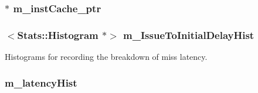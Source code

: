 \label{classSequencer_a0dbfb83f6edf61cad3d0aebdc89ed370}
\hypertarget{classSequencer_ad75cc69f67160a8550641442ffdb6a47}{
\subsubsection[{m\_\-instCache\_\-ptr}]{$\ast$ {\bf m\_\-instCache\_\-ptr}}}
\label{classSequencer_ad75cc69f67160a8550641442ffdb6a47}
\hypertarget{classSequencer_a503562ca3d885333c87da80d05ee612a}{
\subsubsection[{m\_\-IssueToInitialDelayHist}]{$<${\bf Stats::Histogram} $\ast$$>$ {\bf m\_\-IssueToInitialDelayHist}}}
\label{classSequencer_a503562ca3d885333c87da80d05ee612a}


Histograms for recording the breakdown of miss latency. \hypertarget{classSequencer_aeb3fc96d5f4638c5599ed141c6c6bda7}{
\subsubsection[{m\_\-latencyHist}]{ {\bf m\_\-latencyHist}}}
\label{classSequencer_aeb3fc96d5f4638c5599ed141c6c6bda7}


